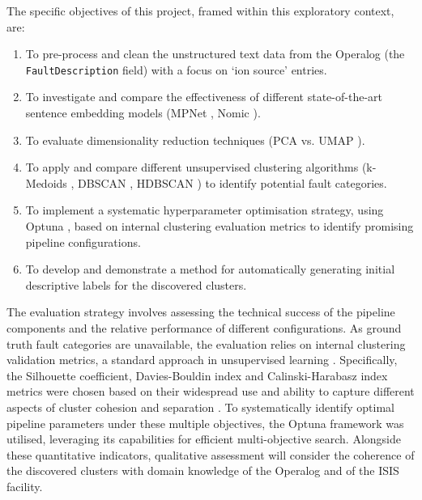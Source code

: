 \documentclass[10pt,oneside]{report}
\begin{document}
The specific objectives of this project, framed within this exploratory context, are:
\begin{enumerate}
    \item To pre-process and clean the unstructured text data from the Operalog (the \\ \texttt{FaultDescription} field) with a focus on `ion source' entries.
    \item To investigate and compare the effectiveness of different state-of-the-art sentence embedding models (MPNet \cite{song2020mpnet}, Nomic \cite{nussbaum2024nomic}).
    \item To evaluate dimensionality reduction techniques (PCA \cite{pearson1901liii} vs. UMAP \cite{mcinnes2018umap}).
    \item To apply and compare different unsupervised clustering algorithms (k-Medoids \cite{kmedoids}, DBSCAN \cite{ester1996density}, HDBSCAN \cite{campello2013density}) to identify potential fault categories.
    \item To implement a systematic hyperparameter optimisation strategy, using Optuna \cite{akiba2019optuna}, based on internal clustering evaluation metrics \cite{rousseeuw1987silhouettes, davies1979cluster, calinski1974dendrite} to identify promising pipeline configurations.
    \item To develop and demonstrate a method for automatically generating initial descriptive labels for the discovered clusters.
\end{enumerate}


The evaluation strategy involves assessing the technical success of the pipeline components and the relative performance of different configurations. As ground truth fault categories are unavailable, the evaluation relies on internal clustering validation metrics, a standard approach in unsupervised learning . Specifically, the Silhouette coefficient, Davies-Bouldin index and Calinski-Harabasz index metrics were chosen based on their widespread use and ability to capture different aspects of cluster cohesion and separation \cite{rousseeuw1987silhouettes, davies1979cluster, calinski1974dendrite}. To systematically identify optimal pipeline parameters under these multiple objectives, the Optuna framework \cite{akiba2019optuna} was utilised, leveraging its capabilities for efficient multi-objective search. Alongside these quantitative indicators, qualitative assessment will consider the coherence of the discovered clusters with domain knowledge of the Operalog and of the ISIS facility.
\end{document}
